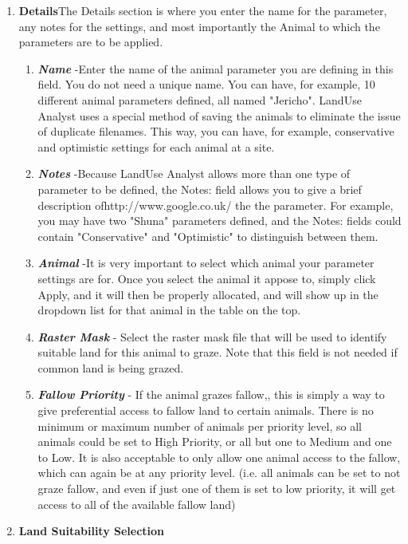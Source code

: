   \begin{enumerate}
    \item \textbf{Details}The Details section is where you enter the name for
the parameter, any notes for the settings, and most importantly the Animal to
which the parameters are to be applied.
      \begin{enumerate}
        \item \textit{\textbf{Name}} -Enter the name of the animal parameter you
are defining in this field. You do not need a unique name. You can have, for
example, 10 different animal parameters defined, all named "Jericho". LandUse
Analyst uses a special method of saving the animals to eliminate the issue of
duplicate filenames. This way, you can have, for example, conservative and
optimistic settings for each animal at a site.
        \item \textit{\textbf{Notes}} -Because LandUse Analyst allows more than
one type of parameter to be defined, the Notes: field allows you to give a brief
description ofhttp://www.google.co.uk/ the the parameter. For example, you may
have two "Shuna" parameters defined, and the Notes: fields could contain
"Conservative" and "Optimistic" to distinguish between them. 
        \item \textit{\textbf{Animal}} -It is very important to select which
animal your parameter settings are for. Once you select the animal it appose to,
simply click Apply, and it will then be properly allocated, and will show up in
the dropdown list for that animal in the table on the top. 
        \item \textit{\textbf{Raster Mask}} - Select the raster mask file that
will be used to identify suitable land for this animal to graze.  Note that this
field is not needed if common land is being grazed.
        \item \textit{\textbf{Fallow Priority}} - If the animal grazes fallow,,
this is simply a way to give preferential access to fallow land to certain
animals.  There is no minimum or maximum number of animals per priority level,
so all animals could be set to High Priority, or all but one to Medium and one
to Low.  It is also acceptable to only allow one animal access to the fallow,
which can again be at any priority level.  (i.e. all animals can be set to not
graze fallow, and even if just one of them is set to low priority, it will get
access to all of the available fallow land)
      \end{enumerate}
    \item \textbf{Land Suitability Selection}

\end{enumerate}
